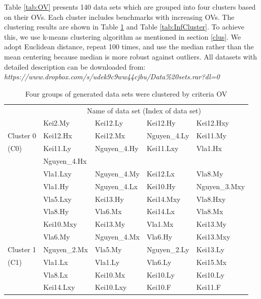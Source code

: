 Table \ref{tab:OV} presents 140 data sets which are grouped into four clusters based on their OVs. Each cluster includes benchmarks with increasing OVs. The clustering results are shown in Table \ref{tab:cluster} and Table \ref{tab:InfCluster}.  To achieve this, we use k-means clustering algorithm as mentioned in section \ref{clus}. We adopt Euclidean distance, repeat 100 times, and use the median rather than the mean centering because median is more robust against outliers. All datasets with detailed description can be downloaded from:\\ \textit{https://www.dropbox.com/s/udek9c9ww44cjbu/Data\%20sets.rar?dl=0}
\begin{table}
\caption{Four groups of generated data sets were clustered by criteria OV}
\label{tab:cluster}       %
\begin{tabular}{lllll}
\hline\noalign{\smallskip}
& \multicolumn{4}{c}{Name of data set (Index of data set)} \\
\noalign{\smallskip}\hline\noalign{\smallskip}
& Kei2.My & Kei12.Ly & Kei12.Hy & Kei12.Hxy \\
Cluster 0 & Kei12.Hx & Kei12.Mx & Nguyen\_4.Ly & Kei11.My \\
(C0) & Kei11.Ly & Nguyen\_4.Hy & Kei11.Lxy & Vla1.Hx \\
& Nguyen\_4.Hx & & & \\
\hline
& Vla1.Lxy & Nguyen\_4.My & Kei12.Lx & Vla8.My \\
& Vla1.Hy & Nguyen\_4.Lx & Kei10.Hy & Nguyen\_3.Mxy \\
& Vla5.Lxy & Kei13.Hy & Kei14.Mxy & Vla8.Hxy \\
& Vla8.Hy & Vla6.Mx & Kei14.Lx & Vla8.Mx \\
& Kei10.Mxy & Kei13.My & Vla1.Mx & Kei13.My \\
& Vla6.My & Nguyen\_4.Mx & Vla6.Hy & Kei13.Mxy \\
Cluster 1 & Nguyen\_2.Mx & Vla5.My & Nguyen\_2.Ly & Kei13.Ly \\
(C1) & Vla1.Lx & Vla1.Ly & Vla6.Ly & Kei15.Mx \\
& Vla8.Lx & Kei10.Mx & Kei10.Ly & Kei10.Ly \\
& Kei14.Lxy & Kei10.Lxy & Kei10.F & Kei11.F \\

\end{tabular}
\end{table}
